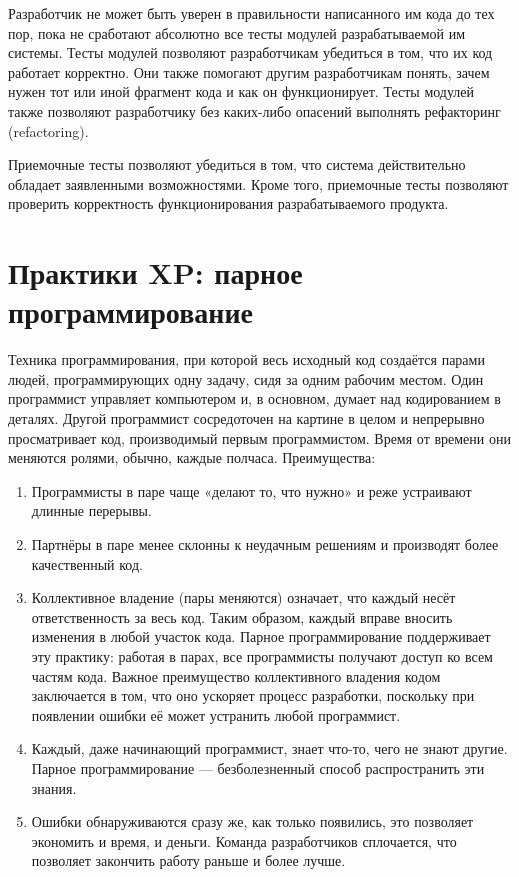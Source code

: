 \documentclass{article}
\let\stdsection\section
\renewcommand\section{\newpage\stdsection}
\begin{document}
    Разработчик не может быть уверен в правильности написанного им кода до тех пор, пока не сработают абсолютно все тесты модулей разрабатываемой им системы. Тесты модулей позволяют разработчикам убедиться в том, что их код работает корректно. Они также помогают другим разработчикам понять, зачем нужен тот или иной фрагмент кода и как он функционирует. Тесты модулей также позволяют разработчику без каких-либо опасений выполнять рефакторинг (refactoring).

    Приемочные тесты позволяют убедиться в том, что система действительно обладает заявленными возможностями. Кроме того, приемочные тесты позволяют проверить корректность функционирования разрабатываемого продукта.

\section{Практики XP: парное программирование}
    Техника программирования, при которой весь исходный код создаётся парами людей, программирующих одну задачу, сидя за одним рабочим местом. Один программист управляет компьютером и, в основном, думает над кодированием в деталях. Другой программист сосредоточен на картине в целом и непрерывно просматривает код, производимый первым программистом. Время от времени они меняются ролями, обычно, каждые полчаса.
    Преимущества:
    \begin{enumerate}
        \item Программисты в паре чаще «делают то, что нужно» и реже устраивают длинные перерывы.
        \item Партнёры в паре менее склонны к неудачным решениям и производят более качественный код.
        \item Коллективное владение (пары меняются) означает, что каждый несёт ответственность за весь код. Таким образом, каждый вправе вносить изменения в любой участок кода. Парное программирование поддерживает эту практику: работая в парах, все программисты получают доступ ко всем частям кода. Важное преимущество коллективного владения кодом заключается в том, что оно ускоряет процесс разработки, поскольку при появлении ошибки её может устранить любой программист.
        \item Каждый, даже начинающий программист, знает что-то, чего не знают другие. Парное программирование — безболезненный способ распространить эти знания.
        \item Ошибки обнаруживаются сразу же, как только появились, это позволяет экономить и время, и деньги. Команда разработчиков сплочается, что позволяет закончить работу раньше и более лучше.
    \end{enumerate}
\end{document}
